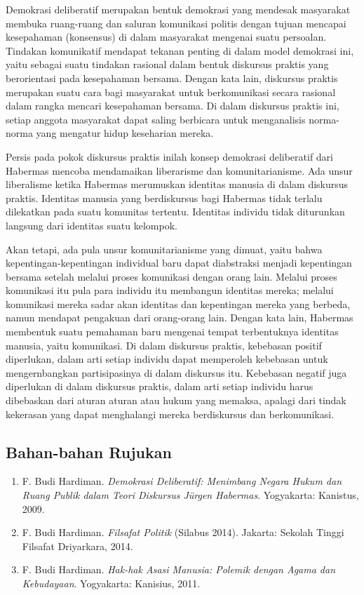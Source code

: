 \documentclass[11pt,twoside,a5paper,openany]{memoir}
\def\tightlist{}
\begin{document}
Demokrasi deliberatif merupakan bentuk demokrasi yang mendesak
masyarakat membuka ruang-ruang dan saluran komunikasi politis dengan
tujuan mencapai kesepahaman (konsensus) di dalam masyarakat mengenai
suatu persoalan. Tindakan komunikatif mendapat tekanan penting di dalam
model demokrasi ini, yaitu sebagai suatu tindakan rasional dalam bentuk
diskursus praktis yang berorientasi pada kesepahaman bersama. Dengan
kata lain, diskursus praktis merupakan suatu cara bagi masyarakat untuk
berkomunikasi secara rasional dalam rangka mencari kesepahaman bersama.
Di dalam diskursus praktis ini, setiap anggota masyarakat dapat saling
berbicara untuk menganalisis norma-norma yang mengatur hidup keseharian
mereka.

Persis pada pokok diskursus praktis inilah konsep demokrasi deliberatif
dari Habermas mencoba mendamaikan liberarisme dan komunitarianisme. Ada
unsur liberalisme ketika Habermas merumuskan identitas manusia di dalam
diskursus praktis. Identitas manusia yang berdiskursus bagi Habermas
tidak terlalu dilekatkan pada suatu komunitas tertentu. Identitas
individu tidak diturunkan langsung dari identitas suatu kelompok.

Akan tetapi, ada pula unsur komunitarianisme yang dimuat, yaitu bahwa
kepentingan-kepentingan individual baru dapat diabstraksi menjadi
kepentingan bersama setelah melalui proses komunikasi dengan orang lain.
Melalui proses komunikasi itu pula para individu itu membangun identitas
mereka; melalui komunikasi mereka sadar akan identitas dan kepentingan
mereka yang berbeda, namun mendapat pengakuan dari orang-orang lain.
Dengan kata lain, Habermas membentuk suatu pemahaman baru mengenai
tempat terbentuknya identitas manusia, yaitu komunikasi. Di dalam
diskursus praktis, kebebasan positif diperlukan, dalam arti setiap
individu dapat memperoleh kebebasan untuk mengernbangkan partisipasinya
di dalam diskursus itu. Kebebasan negatif juga diperlukan di dalam
diskursus praktis, dalam arti setiap individu harus dibebaskan dari
aturan aturan atau hukum yang memaksa, apalagi dari tindak kekerasan
yang dapat menghalangi mereka berdiskursus dan berkomunikasi.

\hypertarget{bahan-bahan-rujukan-2}{%
\subsection{Bahan-bahan Rujukan}\label{bahan-bahan-rujukan-2}}

\begin{enumerate}
\def\labelenumi{\arabic{enumi}.}
\tightlist
\item
  F. Budi Hardiman. \emph{Demokrasi Deliberatif: Menimbang Negara Hukum
  dan} \emph{Ruang Publik dalam Teori Diskursus Jürgen Habermas}.
  Yogyakarta: Kanistus, 2009.
\item
  F. Budi Hardiman. \emph{Filsafat Politik} (Silabus 2014). Jakarta:
  Sekolah Tinggi Filsafat Driyarkara, 2014.
\item
  F. Budi Hardiman. \emph{Hak-hak Asasi Manusia: Polemik dengan Agama
  dan} \emph{Kebudayaan}. Yogyakarta: Kanisius, 2011.
\end{enumerate}
\end{document}

